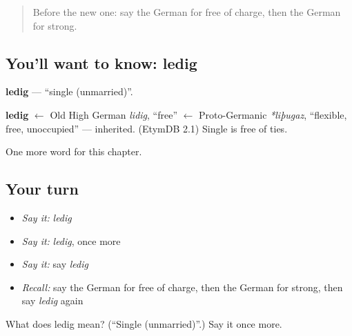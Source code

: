 \label{lesson:GE-C217-ledig}



\begin{quote}
Before the new one: say the German for free of charge, then the German for strong.
\end{quote}

\subsection*{You'll want to know: ledig}
\textbf{ledig} — \textquotedblleft{}single (unmarried)\textquotedblright{}.

\begin{cousinweb}
\textbf{ledig} $\leftarrow$ Old High German \emph{lidig}, \textquotedblleft{}free\textquotedblright{} $\leftarrow$ Proto-Germanic \emph{*liþugaz}, \textquotedblleft{}flexible, free, unoccupied\textquotedblright{} — inherited. (EtymDB 2.1) Single is free of ties.
\end{cousinweb}

\begin{grammarlens}[title={What you've built}]
One more word for this chapter.
\end{grammarlens}

\subsection*{Your turn}
\begin{itemize}
\raggedright
  \item \emph{Say it:} \emph{ledig}
  \item \emph{Say it:} \emph{ledig}, once more
  \item \emph{Say it:} say \emph{ledig}
  \item \emph{Recall:} say the German for free of charge, then the German for strong, then say \emph{ledig} again
\end{itemize}

\begin{tcolorbox}[breakable,colback=teal!4,colframe=teal!35!black,title={Before you move on}]
What does ledig mean? (\textquotedblleft{}Single (unmarried)\textquotedblright{}.) Say it once more.
\end{tcolorbox}
